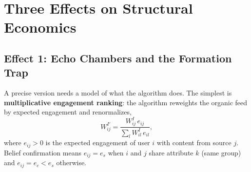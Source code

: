 \documentclass[../structural_economics_book.tex]{subfiles}
\begin{document}
\section{Three Effects on Structural Economics}
\label{ch27:sec:effects}

\subsection{Effect 1: Echo Chambers and the Formation Trap}

A precise version needs a model of what the algorithm does. The simplest is \textbf{multiplicative engagement ranking}: the algorithm reweights the organic feed by expected engagement and renormalizes,
\begin{equation}\label{ch27:eq:reweight}
W^{I'}_{ij} = \frac{W^I_{ij}\,e_{ij}}{\sum_l W^I_{il}\,e_{il}},
\end{equation}
where $e_{ij} > 0$ is the expected engagement of user $i$ with content from source $j$. Belief confirmation means $e_{ij} = e_s$ when $i$ and $j$ share attribute $k$ (same group) and $e_{ij} = e_c < e_s$ otherwise.
\end{document}
